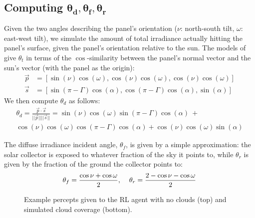 \documentclass{article}
\begin{document}
{%
\subsection{Computing $\pmb{\theta_d, \theta_f, \theta_r}$}
Given the two angles describing the panel's orientation ($\nu$: north-south tilt, $\omega$: east-west tilt), we simulate the amount of total irradiance actually hitting the panel's surface, given the panel's orientation relative to the sun. The models of~\citet{masters2013renewable} give $\theta_t$ in terms of the $\cos$-similarity between the panel's normal vector and the sun's vector (with the panel as the origin):
\begin{align*}
\vec{p} &= \left[ \sin(\nu)  \cos(\omega), \cos(\nu)  \cos(\omega), \cos(\nu) \cos(\omega) \right] \\
\vec{s} &= \left[ \sin(\pi - \Gamma)  \cos(\alpha), \cos(\pi - \Gamma)  \cos(\alpha), \sin(\alpha) \right]
\end{align*}
We then compute $\theta_d$ as follows:
\begin{multline*}
\theta_d = \frac{\vec{p} \cdot \vec{s}}{||\vec{p}|| ||\vec{s} ||} = \sin(\nu)  \cos(\omega)  \sin(\pi - \Gamma)  \cos(\alpha)\ + \\
\cos(\nu)  \cos(\omega)  \cos(\pi - \Gamma)  \cos(\alpha) +  \cos(\nu) \cos(\omega)  \sin(\alpha) 
\end{multline*}

The diffuse irradiance incident angle, $\theta_f$, is given by a simple approximation: the solar collector is exposed to whatever fraction of the sky it points to, while $\theta_r$ is given by the fraction of the ground the collector points to:
\begin{equation}
\theta_f = \frac{\cos \nu + \cos \omega}{2}, \hspace{4mm} \theta_r = \frac{2 - \cos\nu - \cos \omega}{2}
\end{equation}

\begin{figure}[t]
\begin{center}
 \hspace{16mm} %
\caption{Example percepts given to the RL agent with no clouds (top) and simulated cloud coverage (bottom).}
\end{center}
\end{figure}


}
\end{document}

